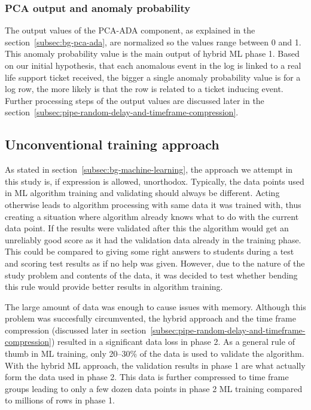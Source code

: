 \subsubsection*{PCA output and anomaly probability}

The output values of the PCA-ADA component,
as explained in the section~\ref{subsec:bg-pca-ada},
are normalized so the values range between 0 and 1.
This anomaly probability value
is the main output of hybrid ML phase 1.
Based on our initial hypothesis,
that each anomalous event in the log
is linked to a real life support ticket received,
the bigger a single anomaly probability value is for a log row,
the more likely is that the row is related to a ticket inducing event.
Further processing steps of the output values
are discussed later in the section~\ref{subsec:pipe-random-delay-and-timeframe-compression}.



\subsection{Unconventional training approach}\label{subsec:pipe-unconventional-training}

As stated in section~\ref{subsec:bg-machine-learning},
the approach we attempt in this study is,
if expression is allowed, unorthodox.
Typically,
the data points used in ML algorithm training and validating
should always be different.
Acting otherwise leads to algorithm processing with
same data it was trained with,
thus creating a situation
where algorithm already knows what to do with the current data point.
If the results were validated after this
the algorithm would get an unreliably good score
as it had the validation data already in the training phase.
This could be compared to
giving some right answers to students during a test
and scoring test results as if no help was given.
However,
due to the nature of the study problem and contents of the data,
it was decided to test whether bending this rule
would provide better results in algorithm training.

The large amount of data was enough
to cause issues with memory.
Although this problem was succesfully circumvented,
the hybrid approach and the time frame compression
(discussed later in section~\ref{subsec:pipe-random-delay-and-timeframe-compression})
resulted in a significant data loss in phase 2.
As a general rule of thumb in ML training,
only 20--30\% of the data is used to validate the algorithm.
With the hybrid ML approach,
the validation results in phase 1
are what actually form the data used in phase 2.
This data is further compressed to time frame groups
leading to only a few dozen data points in phase 2 ML training
compared to millions of rows in phase 1.

